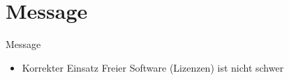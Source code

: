 \section{Message}

\begin{frame}{Message}
	\begin{itemize}
		\item Korrekter Einsatz Freier Software (Lizenzen) ist nicht schwer
	\end{itemize}
\end{frame}
